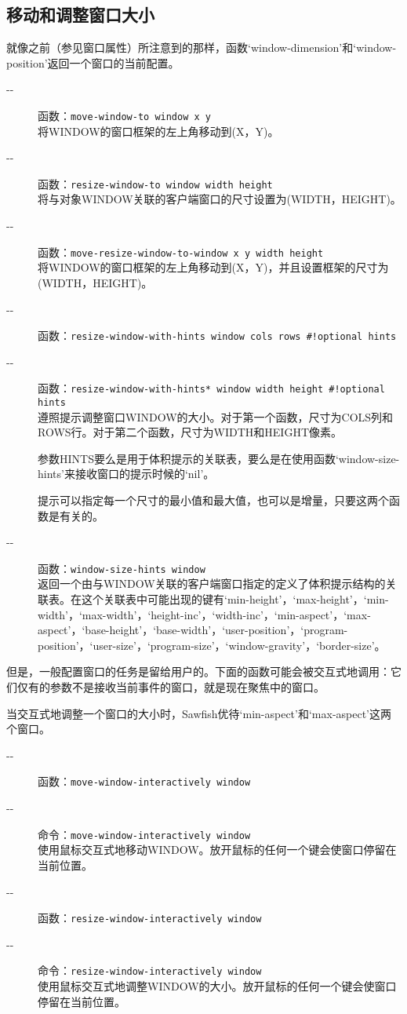 \documentclass{book}
\begin{document}
\begin{CJK*}{UTF8}{gbsn}
\section{移动和调整窗口大小}
就像之前（参见窗口属性）所注意到的那样，函数`window-dimension'和`window-position'返回一个窗口的当前配置。
\begin{description}
\item[-{}-] 函数：\verb|move-window-to window x y|\\
将WINDOW的窗口框架的左上角移动到(X，Y)。
\item[-{}-] 函数：\verb|resize-window-to window width height|\\
将与对象WINDOW关联的客户端窗口的尺寸设置为(WIDTH，HEIGHT)。
\item[-{}-] 函数：\verb|move-resize-window-to-window x y width height|\\
将WINDOW的窗口框架的左上角移动到(X，Y)，并且设置框架的尺寸为(WIDTH，HEIGHT)。
\item[-{}-] 函数：\verb|resize-window-with-hints window cols rows #!optional hints|\\
\item[-{}-] 函数：\verb|resize-window-with-hints* window width height #!optional hints|\\
遵照提示调整窗口WINDOW的大小。对于第一个函数，尺寸为COLS列和ROWS行。对于第二个函数，尺寸为WIDTH和HEIGHT像素。

参数HINTS要么是用于体积提示的关联表，要么是在使用函数`window-size-hints'来接收窗口的提示时候的`nil'。

提示可以指定每一个尺寸的最小值和最大值，也可以是增量，只要这两个函数是有关的。
\item[-{}-] 函数：\verb|window-size-hints window|\\
返回一个由与WINDOW关联的客户端窗口指定的定义了体积提示结构的关联表。在这个关联表中可能出现的键有`min-height'，`max-height'，`min-width'，`max-width'，`height-inc'，`width-inc'，`min-aspect'，`max-aspect'，`base-height'，`base-width'，`user-position'，`program-position'，`user-size'，`program-size'，`window-gravity'，`border-size'。
\end{description}

但是，一般配置窗口的任务是留给用户的。下面的函数可能会被交互式地调用：它们仅有的参数不是接收当前事件的窗口，就是现在聚焦中的窗口。

当交互式地调整一个窗口的大小时，Sawfish优待`min-aspect'和`max-aspect'这两个窗口。
\begin{description}
\item[-{}-] 函数：\verb|move-window-interactively window|
\item[-{}-] 命令：\verb|move-window-interactively window|\\
使用鼠标交互式地移动WINDOW。放开鼠标的任何一个键会使窗口停留在当前位置。
\item[-{}-] 函数：\verb|resize-window-interactively window|
\item[-{}-] 命令：\verb|resize-window-interactively window|\\
使用鼠标交互式地调整WINDOW的大小。放开鼠标的任何一个键会使窗口停留在当前位置。


\end{description}
\end{CJK*}
\end{document}
